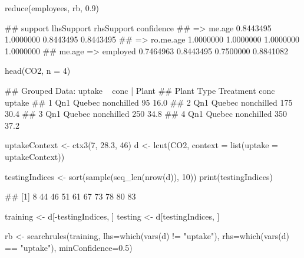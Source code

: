 \documentclass{article}\usepackage[]{graphicx}\usepackage[]{color}
\begin{document}
\begin{Schunk}
% --begin: "reduce"
\begin{Sinput}
reduce(employees, rb, 0.9)
\end{Sinput}
\begin{Soutput}
##                      support lhsSupport rhsSupport confidence
##  => me.age         0.8443495  1.0000000  0.8443495  0.8443495
##  => ro.me.age      1.0000000  1.0000000  1.0000000  1.0000000
## me.age => employed 0.7464963  0.8443495  0.7500000  0.8841082
\end{Soutput}
%
% --end: "reduce"
\end{Schunk}

\begin{Schunk}
% --begin: "pbld1"
\begin{Sinput}
head(CO2, n = 4)
\end{Sinput}
\begin{Soutput}
## Grouped Data: uptake ~ conc | Plant
##   Plant   Type  Treatment conc uptake
## 1   Qn1 Quebec nonchilled   95   16.0
## 2   Qn1 Quebec nonchilled  175   30.4
## 3   Qn1 Quebec nonchilled  250   34.8
## 4   Qn1 Quebec nonchilled  350   37.2
\end{Soutput}
%
% --end: "pbld1"
\end{Schunk}

\begin{Schunk}
% --begin: "pbld2"
\begin{Sinput}
uptakeContext <- ctx3(7, 28.3, 46)
d <- lcut(CO2, context = list(uptake = uptakeContext))
\end{Sinput}
%
% --end: "pbld2"
\end{Schunk}

\begin{Schunk}
% --begin: "pbld3"
\begin{Sinput}
testingIndices <- sort(sample(seq_len(nrow(d)), 10))
print(testingIndices)
\end{Sinput}
\begin{Soutput}
##  [1]  8 44 46 51 61 67 73 78 80 83
\end{Soutput}
\begin{Sinput}
training <- d[-testingIndices, ]
testing <- d[testingIndices, ]
\end{Sinput}
%
% --end: "pbld3"
\end{Schunk}

\begin{Schunk}
% --begin: "pbld4"
\begin{Sinput}
rb <- searchrules(training,
                  lhs=which(vars(d) != "uptake"),
                  rhs=which(vars(d) == "uptake"),
                  minConfidence=0.5)
\end{Sinput}
%
% --end: "pbld4"
\end{Schunk}
\end{document}
